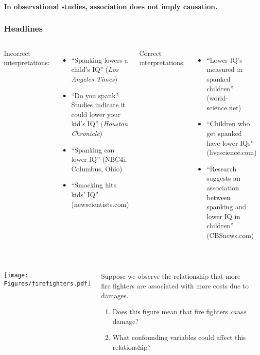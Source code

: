 \begin{frame}
\Large{\textbf{In observational studies, association does not imply causation.}}
\end{frame}

\begin{frame}
\frametitle{Headlines}
\begin{columns}
Incorrect interpretations:
\begin{itemize}
    \item
    ``Spanking lowers a child's IQ'' (\emph{Los Angeles Times})
    \item
    ``Do you spank? Studies indicate it could lower your kid's IQ'' (\emph{Houston Chronicle})
    \item
    ``Spanking can lower IQ'' (NBC4i, Columbus, Ohio)
    \item
    ``Smacking hits kids' IQ'' (newscientists.com)
\end{itemize}
Correct interpretations:
\begin{itemize}
    \item
    ``Lower IQ's measured in spanked children'' (world-science.net)
    \item
    ``Children who get spanked have lower IQs'' (livescience.com)
    \item
    ``Research suggests an association between spanking and lower IQ in children'' (CBSnews.com)
\end{itemize}
\end{columns}
\end{frame}

\begin{frame}
\frametitle{\grp}
\begin{columns}
\texttt{[image: Figures/firefighters.pdf]}
\begin{clicker}{Suppose we observe the relationship that more fire fighters are associated with more costs due to damages.}
\begin{enumerate}
    \item
    Does this figure mean that fire fighters \emph{cause} damage?
    \item
    What confounding variables could affect this relationship?
\end{enumerate}
\end{clicker}
\end{columns}
\end{frame}


